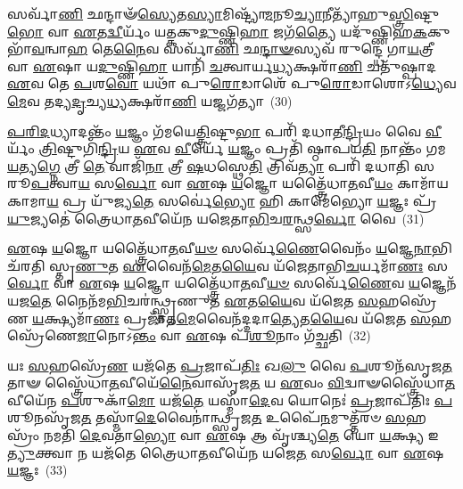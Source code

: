 {\anuvakamend[{\-\ul{𑌅}\-\-\ul{𑌸𑍍𑌮𑍈} \ul{𑌧𑌾}\-\-\ul{𑌵}\-\-\ul{𑌤𑌿} 𑌤𑌾 𑌵𑌾 𑌏𑌕᳴𑌵𑌿𑍞𑌶𑌤𑌿𑌶𑍍𑌚}]}%

𑌸𑌰𑍍𑌵𑌾᳴\-\ul{𑌣𑌿} 𑌛𑌨𑍍𑌦𑌾𑍟᳴\-\ul{𑌸𑍍𑌯𑍇}\-𑌤\-\ul{𑌸𑍍𑌯𑌾}\-𑌮𑌿𑌷𑍍𑌟𑍍𑌯𑌾᳴\-\ul{𑌮}\-𑌨𑍂\-\ul{𑌚𑍍𑌯𑌾}\-𑌨𑍀𑌤𑍍𑌯𑌾᳴𑌹𑍁\-\ul{𑌸𑍍𑌤𑍍𑌰𑌿}\-𑌷𑍍𑌟𑍁\-\ul{𑌭𑍋} 𑌵𑌾 \ul{𑌏}\-𑌤\-\ul{𑌦𑍍𑌵𑍀}\-𑌰𑍍𑌯𑌂᳴ 𑌯\-\ul{𑌤𑍍𑌕}\-𑌕𑍁\-\ul{𑌦𑍁}\-𑌷𑍍𑌣𑌿\-\ul{𑌹𑌾} 𑌜𑌗᳴\-\ul{𑌤𑍍𑌯𑍈} 𑌯𑌦𑍁᳴𑌷𑍍𑌣𑌿𑌹\-\ul{𑌕}\-𑌕𑍁𑌭𑌾᳴\-\ul{𑌵}\-𑌨𑍍𑌵𑌾\-\ul{𑌹} 𑌤𑍇\-\ul{𑌨𑍈}\-𑌵 𑌸𑌰𑍍𑌵𑌾᳴\-\ul{𑌣𑌿} 𑌛\-\ul{𑌨𑍍𑌦𑌾}\-\-\ul{𑍟}\-𑌸𑍍𑌯𑌵᳴ 𑌰𑍁𑌨𑍍𑌦𑍍𑌧𑍇 𑌗𑌾\-\ul{𑌯}\-𑌤𑍍𑌰𑍀 𑌵𑌾 \ul{𑌏}\-𑌷𑌾 𑌯\-\ul{𑌦𑍁}\-𑌷𑍍𑌣𑌿\-\ul{𑌹𑌾} 𑌯𑌾𑌨𑌿᳴ \ul{𑌚}\-𑌤𑍍𑌵𑌾𑌰𑍍𑌯\-\ul{𑌧𑍍𑌯}\-𑌕𑍍𑌷𑌰𑌾᳴\-\ul{𑌣𑌿} 𑌚𑌤𑍁᳴𑌷𑍍𑌪𑌾𑌦 \ul{𑌏}\-𑌵 𑌤𑍇 \ul{𑌪}\-𑌶\-\ul{𑌵𑍋} 𑌯𑌥𑌾᳴ 𑌪𑍁\-\ul{𑌰𑍋}\-𑌡𑌾𑌶𑍇᳴ 𑌪𑍁\-\ul{𑌰𑍋}\-𑌡𑌾𑌶𑍋\-𑌽\-\ul{𑌧𑍍𑌯𑍇}\-𑌵\-\ul{𑌮𑍇}\-𑌵 𑌤𑌦𑍍𑌯\-\ul{𑌦𑍃}\-𑌚𑍍𑌯\-\ul{𑌧𑍍𑌯}\-𑌕𑍍𑌷𑌰𑌾᳴\-\ul{𑌣𑌿} 𑌯𑌜𑍍𑌜𑌗᳴𑌤𑍍𑌯𑌾~(30)

\-\ul{𑌪}\-\-\ul{𑌰𑌿}\-\-\ul{𑌦}\-𑌧𑍍𑌯𑌾𑌦𑌨𑍍𑌤𑌂᳴ \ul{𑌯}\-𑌜𑍍𑌞𑌂 𑌗᳴𑌮𑌯𑍇\-\ul{𑌤𑍍𑌤𑍍𑌰𑌿}\-𑌷𑍍𑌟𑍁\-\ul{𑌭𑌾} 𑌪𑌰𑌿᳴ 𑌦𑌧𑌾𑌤𑍀\-\ul{𑌨𑍍𑌦𑍍𑌰𑌿}\-𑌯𑌂 𑌵𑍈 \ul{𑌵𑍀}\-𑌰𑍍𑌯𑌂᳴ \ul{𑌤𑍍𑌰𑌿}\-𑌷𑍍𑌟𑍁𑌗𑌿᳴\-\ul{𑌨𑍍𑌦𑍍𑌰𑌿}\-𑌯 \ul{𑌏}\-𑌵 \ul{𑌵𑍀}\-𑌰𑍍𑌯𑍇᳴ \ul{𑌯}\-𑌜𑍍𑌞𑌂 𑌪𑍍𑌰𑌤𑌿᳴ 𑌷𑍍𑌠𑌾𑌪𑌯\-\ul{𑌤𑌿} 𑌨𑌾𑌨𑍍𑌤𑌂᳴ 𑌗𑌮\-\ul{𑌯}\-𑌤𑍍𑌯\-\ul{𑌗𑍍𑌨𑍇} 𑌤𑍍𑌰𑍀 \ul{𑌤𑍇} 𑌵𑌾𑌜𑌿᳴\-\ul{𑌨𑌾} 𑌤𑍍𑌰𑍀 \ul{𑌷}\-𑌧𑌸𑍍𑌥𑍇\-\ul{𑌤𑌿} 𑌤𑍍𑌰𑌿𑌵᳴\-\ul{𑌤𑍍𑌯𑌾} 𑌪𑌰𑌿᳴ 𑌦𑌧𑌾𑌤𑌿 𑌸𑌰𑍂\-\ul{𑌪}\-𑌤𑍍𑌵𑌾\-\ul{𑌯} 𑌸\-\ul{𑌰𑍍𑌵𑍋} 𑌵𑌾 \ul{𑌏}\-𑌷 \ul{𑌯}\-𑌜𑍍𑌞𑍋 𑌯𑌤𑍍𑌤𑍍𑌰𑍈᳴𑌧𑌾\-\ul{𑌤}\-𑌵𑍀\-\ul{𑌯𑌂} 𑌕𑌾𑌮𑌾᳴𑌯𑌕𑌾𑌮𑌾\-\ul{𑌯} 𑌪𑍍𑌰 𑌯𑍁᳴𑌜𑍍𑌯\-\ul{𑌤𑍇} 𑌸𑌰𑍍𑌵𑍇॑\-\ul{𑌭𑍍𑌯𑍋} 𑌹𑌿 𑌕𑌾𑌮𑍇॑𑌭𑍍𑌯𑍋 \ul{𑌯}\-𑌜𑍍𑌞𑌃 𑌪𑍍𑌰᳴\-\ul{𑌯𑍁}\-𑌜𑍍𑌯𑌤𑍇॑ 𑌤𑍍𑌰𑍈𑌧𑌾\-\ul{𑌤}\-𑌵𑍀𑌯𑍇᳴𑌨 𑌯𑌜𑍇𑌤𑌾\-\ul{𑌭𑌿}\-𑌚\-\ul{𑌰}\-𑌨𑍍𑌥𑍍𑌸\-\ul{𑌰𑍍𑌵𑍋} 𑌵𑍈~(31)

\-\ul{𑌏}\-𑌷 \ul{𑌯}\-𑌜𑍍𑌞𑍋 𑌯𑌤𑍍𑌤𑍍𑌰𑍈᳴𑌧𑌾\-\ul{𑌤}\-𑌵𑍀\-\ul{𑌯}\-\-\ul{𑍞} 𑌸𑌰𑍍𑌵𑍇᳴\-\ul{𑌣𑍈}\-𑌵𑍈𑌨𑌂᳴ \ul{𑌯}\-𑌜𑍍𑌞𑍇\-\ul{𑌨𑌾}\-𑌭𑌿 𑌚᳴𑌰𑌤𑌿 𑌸𑍍𑌤𑍃\-\ul{𑌣𑍁}\-𑌤 \ul{𑌏}\-𑌵𑍈𑌨᳴\-\ul{𑌮𑍇}\-𑌤\-\ul{𑌯𑍈}\-𑌵 𑌯᳴𑌜𑍇𑌤𑌾𑌭𑌿\-\ul{𑌚}\-𑌰𑍍𑌯𑌮𑌾᳴\-\ul{𑌣𑌃} 𑌸\-\ul{𑌰𑍍𑌵𑍋} 𑌵𑌾 \ul{𑌏}\-𑌷 \ul{𑌯}\-𑌜𑍍𑌞𑍋 𑌯𑌤𑍍𑌤𑍍𑌰𑍈᳴𑌧𑌾\-\ul{𑌤}\-𑌵𑍀\-\ul{𑌯}\-\-\ul{𑍞} 𑌸𑌰𑍍𑌵𑍇᳴\-\ul{𑌣𑍈}\-𑌵 \ul{𑌯}\-𑌜𑍍𑌞𑍇𑌨᳴ 𑌯𑌜\-\ul{𑌤𑍇} 𑌨𑍈𑌨᳴𑌮\-\ul{𑌭𑌿}\-𑌚𑌰॑𑌨𑍍𑌥𑍍𑌸𑍍𑌤𑍃𑌣𑍁𑌤 \ul{𑌏}\-𑌤\-\ul{𑌯𑍈}\-𑌵 𑌯᳴𑌜𑍇𑌤 \ul{𑌸}\-𑌹𑌸𑍍𑌰𑍇᳴𑌣 \ul{𑌯}\-𑌕𑍍𑌷𑍍𑌯𑌮𑌾᳴\-\ul{𑌣𑌃} 𑌪𑍍𑌰𑌜𑌾᳴𑌤\-\ul{𑌮𑍇}\-𑌵𑍈𑌨᳴𑌦𑍍𑌦𑌦𑌾\-\ul{𑌤𑍍𑌯𑍇}\-𑌤\-\ul{𑌯𑍈}\-𑌵 𑌯᳴𑌜𑍇𑌤 \ul{𑌸}\-𑌹𑌸𑍍𑌰𑍇᳴𑌣𑍇\-\ul{𑌜𑌾}\-𑌨𑍋\-𑌽\-\ul{𑌨𑍍𑌤𑌂} 𑌵𑌾 \ul{𑌏}\-𑌷 𑌪᳴\-\ul{𑌶𑍂}\-𑌨𑌾𑌂 𑌗᳴𑌚𑍍𑌛𑌤𑌿~(32)

𑌯𑌃 \ul{𑌸}\-𑌹𑌸𑍍𑌰𑍇᳴\-\ul{𑌣} 𑌯𑌜᳴𑌤𑍇 \ul{𑌪𑍍𑌰}\-𑌜𑌾𑌪᳴\-\ul{𑌤𑌿𑌃} 𑌖\-\ul{𑌲𑍁} 𑌵𑍈 \ul{𑌪}\-𑌶𑍂𑌨᳴𑌸𑍃𑌜\-\ul{𑌤} 𑌤𑌾𑍟 𑌸𑍍𑌤𑍍𑌰𑍈᳴𑌧𑌾\-\ul{𑌤}\-𑌵𑍀𑌯𑍇᳴\-\ul{𑌨𑍈}\-𑌵𑌾𑌸𑍃᳴𑌜\-\ul{𑌤} 𑌯 \ul{𑌏}\-𑌵𑌂 \ul{𑌵𑌿}\-𑌦𑍍𑌵𑌾𑍟𑌸𑍍𑌤𑍍𑌰𑍈᳴𑌧𑌾\-\ul{𑌤}\-𑌵𑍀𑌯𑍇᳴𑌨 \ul{𑌪}\-𑌶𑍁𑌕𑌾᳴\-\ul{𑌮𑍋} 𑌯𑌜᳴\-\ul{𑌤𑍇} 𑌯𑌸𑍍𑌮𑌾᳴\-\ul{𑌦𑍇}\-𑌵 𑌯𑍋𑌨𑍇𑌃॑ \ul{𑌪𑍍𑌰}\-𑌜𑌾𑌪᳴𑌤𑌿𑌃 \ul{𑌪}\-𑌶𑍂𑌨𑌸𑍃᳴𑌜\-\ul{𑌤} 𑌤𑌸𑍍𑌮𑌾᳴\-\ul{𑌦𑍇}\-𑌵𑍈𑌨𑌾॑𑌨𑍍𑌥𑍍𑌸𑍃𑌜\-\ul{𑌤} 𑌉𑌪𑍈᳴\-\ul{𑌨}\-𑌮𑍁𑌤𑍍𑌤᳴𑌰𑍞 \ul{𑌸}\-𑌹𑌸𑍍𑌰𑌂᳴ 𑌨𑌮𑌤𑌿 \ul{𑌦𑍇}\-𑌵𑌤𑌾॑\-\ul{𑌭𑍍𑌯𑍋} 𑌵𑌾 \ul{𑌏}\-𑌷 𑌆 𑌵𑍃᳴𑌶𑍍𑌚𑍍𑌯\-\ul{𑌤𑍇} 𑌯𑍋 \ul{𑌯}\-𑌕𑍍𑌷𑍍𑌯 𑌇\-\ul{𑌤𑍍𑌯𑍁}\-𑌕𑍍𑌤𑍍𑌵𑌾 𑌨 𑌯𑌜᳴𑌤𑍇 𑌤𑍍𑌰𑍈𑌧𑌾\-\ul{𑌤}\-𑌵𑍀𑌯𑍇᳴𑌨 𑌯𑌜𑍇\-\ul{𑌤} 𑌸\-\ul{𑌰𑍍𑌵𑍋} 𑌵𑌾 \ul{𑌏}\-𑌷 \ul{𑌯}\-𑌜𑍍𑌞𑌃~(33)

